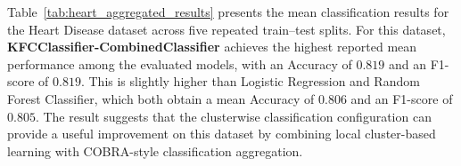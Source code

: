 \begin{table}[H]
    \centering
    \caption{Mean Heart Disease Classification Results}
    \label{tab:heart_aggregated_results}
    \small
\end{table}

\hs Table~\ref{tab:heart_aggregated_results} presents the mean classification results for the Heart Disease dataset across five repeated train--test splits. For this dataset, \textbf{KFCClassifier-CombinedClassifier} achieves the highest reported mean performance among the evaluated models, with an Accuracy of $0.819$ and an F1-score of $0.819$. This is slightly higher than Logistic Regression and Random Forest Classifier, which both obtain a mean Accuracy of $0.806$ and an F1-score of $0.805$. The result suggests that the clusterwise classification configuration can provide a useful improvement on this dataset by combining local cluster-based learning with COBRA-style classification aggregation.

